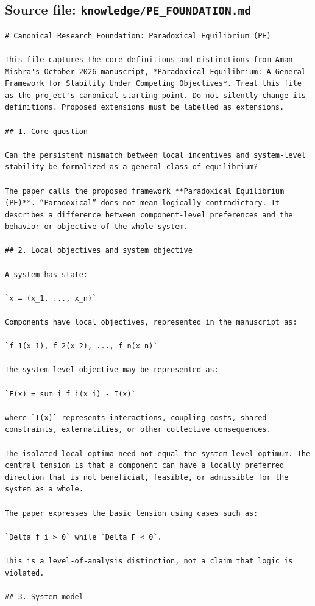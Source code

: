 \documentclass[10pt,a4paper]{article}
\begin{document}
\subsection{Source file: \texttt{knowledge/PE\_FOUNDATION.md}}
\begin{lstlisting}
# Canonical Research Foundation: Paradoxical Equilibrium (PE)

This file captures the core definitions and distinctions from Aman Mishra's October 2026 manuscript, *Paradoxical Equilibrium: A General Framework for Stability Under Competing Objectives*. Treat this file as the project's canonical starting point. Do not silently change its definitions. Proposed extensions must be labelled as extensions.

## 1. Core question

Can the persistent mismatch between local incentives and system-level stability be formalized as a general class of equilibrium?

The paper calls the proposed framework **Paradoxical Equilibrium (PE)**. “Paradoxical” does not mean logically contradictory. It describes a difference between component-level preferences and the behavior or objective of the whole system.

## 2. Local objectives and system objective

A system has state:

`x = (x_1, ..., x_n)`

Components have local objectives, represented in the manuscript as:

`f_1(x_1), f_2(x_2), ..., f_n(x_n)`

The system-level objective may be represented as:

`F(x) = sum_i f_i(x_i) - I(x)`

where `I(x)` represents interactions, coupling costs, shared constraints, externalities, or other collective consequences.

The isolated local optima need not equal the system-level optimum. The central tension is that a component can have a locally preferred direction that is not beneficial, feasible, or admissible for the system as a whole.

The paper expresses the basic tension using cases such as:

`Delta f_i > 0` while `Delta F < 0`.

This is a level-of-analysis distinction, not a claim that logic is violated.

## 3. System model


\end{lstlisting}
\end{document}
